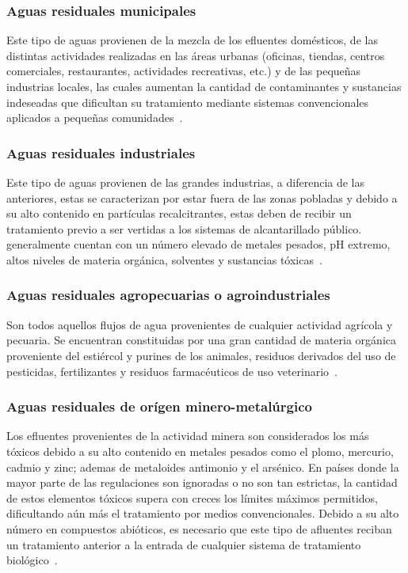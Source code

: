 \subsubsection*{Aguas residuales municipales}
Este tipo de aguas provienen de la mezcla de los efluentes domésticos, de las distintas actividades realizadas en las áreas urbanas (oficinas, tiendas, centros comerciales, restaurantes, actividades recreativas, etc.) y de las pequeñas industrias locales, las cuales aumentan la cantidad de contaminantes y sustancias indeseadas que dificultan su tratamiento mediante sistemas convencionales aplicados a pequeñas comunidades~\citep{lazcano2016}.
\subsubsection*{Aguas residuales industriales}
Este tipo de aguas provienen de las grandes industrias, a diferencia de las anteriores, estas se caracterizan por estar fuera de las zonas pobladas y debido a su alto contenido en partículas recalcitrantes, estas deben de recibir un tratamiento previo a ser vertidas a los sistemas de alcantarillado público. generalmente cuentan con un número elevado de metales pesados, pH extremo, altos niveles de materia orgánica, solventes y sustancias tóxicas~\citep{lazcano2016}.
\subsubsection*{Aguas residuales agropecuarias o agroindustriales}
Son todos aquellos flujos de agua provenientes de cualquier actividad agrícola y pecuaria. Se encuentran constituidas por una gran cantidad de materia orgánica proveniente del estiércol y purines de los animales, residuos derivados del uso de pesticidas, fertilizantes y residuos farmacéuticos de uso veterinario~\citep{lazcano2016}.
\subsubsection*{Aguas residuales de orígen minero-metalúrgico}
Los efluentes provenientes de la actividad minera son considerados los más tóxicos debido a su alto contenido en metales pesados como el plomo, mercurio, cadmio y zinc; ademas de metaloides antimonio y el arsénico. En países donde la mayor parte de las regulaciones son ignoradas o no son tan estrictas, la cantidad de estos elementos tóxicos supera con creces los límites máximos permitidos, dificultando aún más el tratamiento por medios convencionales. Debido a su alto número en compuestos abióticos, es necesario que este tipo de afluentes reciban un tratamiento anterior a la entrada de cualquier sistema de tratamiento biológico~\citep{lazcano2016}.
